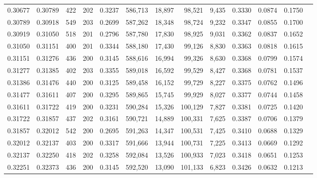 \begin{tabular}{rrrrrrrrrrrrr}
0.30677 & 0.30789 &   422 & 202 &                                     0.3237 & 586,713 &  18,897 &  98,521 &   9,435 & 0.3330 & 0.0874 & 0.1750 \\
0.30789 & 0.30918 &   549 & 203 &                                     0.2699 & 587,262 &  18,348 &  98,724 &   9,232 & 0.3347 & 0.0855 & 0.1700 \\
0.30919 & 0.31050 &   518 & 201 &                                     0.2796 & 587,780 &  17,830 &  98,925 &   9,031 & 0.3362 & 0.0837 & 0.1652 \\
0.31050 & 0.31151 &   400 & 201 &                                     0.3344 & 588,180 &  17,430 &  99,126 &   8,830 & 0.3363 & 0.0818 & 0.1615 \\
0.31151 & 0.31276 &   436 & 200 &                                     0.3145 & 588,616 &  16,994 &  99,326 &   8,630 & 0.3368 & 0.0799 & 0.1574 \\
0.31277 & 0.31385 &   402 & 203 &                                     0.3355 & 589,018 &  16,592 &  99,529 &   8,427 & 0.3368 & 0.0781 & 0.1537 \\
0.31386 & 0.31476 &   440 & 200 &                                     0.3125 & 589,458 &  16,152 &  99,729 &   8,227 & 0.3375 & 0.0762 & 0.1496 \\
0.31477 & 0.31611 &   407 & 200 &                                     0.3295 & 589,865 &  15,745 &  99,929 &   8,027 & 0.3377 & 0.0744 & 0.1458 \\
0.31611 & 0.31722 &   419 & 200 &                                     0.3231 & 590,284 &  15,326 & 100,129 &   7,827 & 0.3381 & 0.0725 & 0.1420 \\
0.31722 & 0.31857 &   437 & 202 &                                     0.3161 & 590,721 &  14,889 & 100,331 &   7,625 & 0.3387 & 0.0706 & 0.1379 \\
0.31857 & 0.32012 &   542 & 200 &                                     0.2695 & 591,263 &  14,347 & 100,531 &   7,425 & 0.3410 & 0.0688 & 0.1329 \\
0.32012 & 0.32137 &   403 & 200 &                                     0.3317 & 591,666 &  13,944 & 100,731 &   7,225 & 0.3413 & 0.0669 & 0.1292 \\
0.32137 & 0.32250 &   418 & 202 &                                     0.3258 & 592,084 &  13,526 & 100,933 &   7,023 & 0.3418 & 0.0651 & 0.1253 \\
0.32251 & 0.32373 &   436 & 200 &                                     0.3145 & 592,520 &  13,090 & 101,133 &   6,823 & 0.3426 & 0.0632 & 0.1213 \\

\end{tabular}
